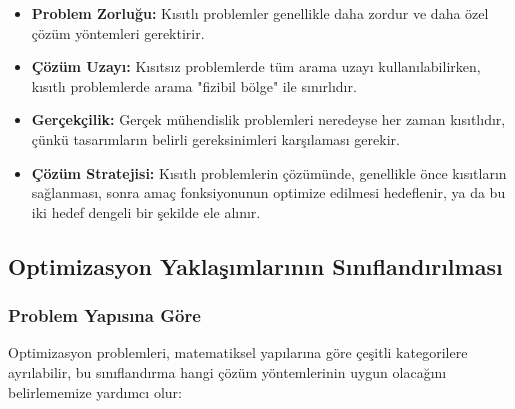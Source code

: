 \begin{itemize}
    \item \textbf{Problem Zorluğu:} Kısıtlı problemler genellikle daha zordur ve daha özel çözüm yöntemleri gerektirir.
    
    \item \textbf{Çözüm Uzayı:} Kısıtsız problemlerde tüm arama uzayı kullanılabilirken, kısıtlı problemlerde arama "fizibil bölge" ile sınırlıdır.
    
    \item \textbf{Gerçekçilik:} Gerçek mühendislik problemleri neredeyse her zaman kısıtlıdır, çünkü tasarımların belirli gereksinimleri karşılaması gerekir.
    
    \item \textbf{Çözüm Stratejisi:} Kısıtlı problemlerin çözümünde, genellikle önce kısıtların sağlanması, sonra amaç fonksiyonunun optimize edilmesi hedeflenir, ya da bu iki hedef dengeli bir şekilde ele alınır.
\end{itemize}


\subsection{Optimizasyon Yaklaşımlarının Sınıflandırılması}

\subsubsection{Problem Yapısına Göre}
Optimizasyon problemleri, matematiksel yapılarına göre çeşitli kategorilere ayrılabilir, bu sınıflandırma hangi çözüm yöntemlerinin uygun olacağını belirlememize yardımcı olur:


